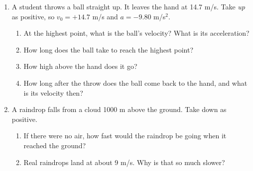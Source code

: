 \documentclass[12pt, twoside]{article}
\begin{document}
\begin{enumerate}[itemsep=0.4cm]
\item A student throws a ball straight up. It leaves the hand at 14.7 m/s. Take
  \emph{up} as positive, so $v_0 = +14.7$ m/s and $a = -9.80$ m/s$^2$.
  \begin{enumerate}[itemsep=0.4cm]
    \item At the highest point, what is the ball's velocity? What is its
      acceleration?
      \vspace{1.4cm}
    \item How long does the ball take to reach the highest point?
      \vspace{2.4cm}
    \item How high above the hand does it go?
      \vspace{2.4cm}
    \item How long after the throw does the ball come back to the hand, and what
      is its velocity then?
      \vspace{2.4cm}
  \end{enumerate}

\item A raindrop falls from a cloud 1000 m above the ground. Take down as positive.
  \begin{enumerate}[itemsep=0.4cm]
    \item If there were no air, how fast would the raindrop be going when it reached
      the ground?
      \vspace{2.6cm}
    \item Real raindrops land at about 9 m/s. Why is that so much slower?
  \end{enumerate}

\end{enumerate}
\end{document}
